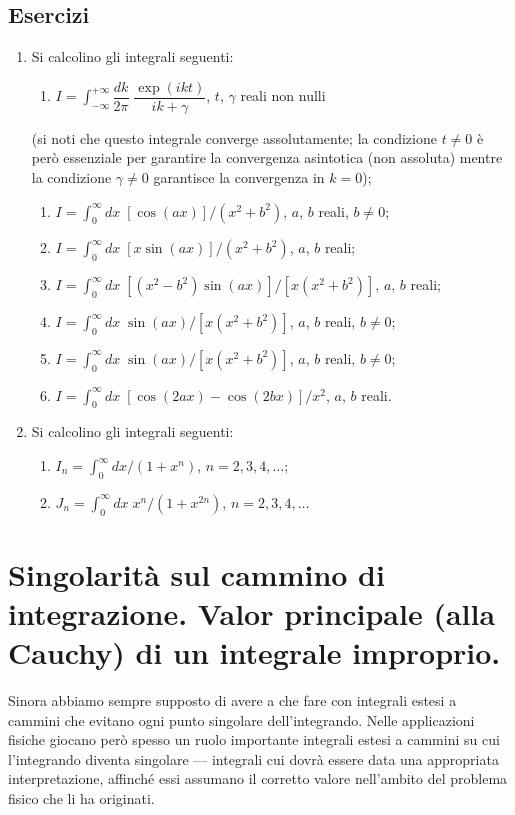 \documentclass[11pt, a4paper]{book}
\numberwithin{equation}{section}
\newenvironment{esercizi}{\subsection*{Esercizi}\begin{enumerate}}{\end{enumerate}}
\begin{document}
\begin{esercizi}
\item Si calcolino gli integrali seguenti:
\begin{enumerate}
\item[i)] $I = \int_{-\infty}^{+\infty} \dfrac{dk}{2\pi}\; \dfrac{\exp(ikt)}{ik+\gamma}$, \quad $t$, $\gamma$ reali non nulli
\end{enumerate}
(si noti che questo integrale converge assolutamente; la condizione $t \neq 0$ è però essenziale per garantire la convergenza asintotica (non assoluta) mentre la condizione $\gamma \neq 0$ garantisce la convergenza in $k=0$);
\begin{enumerate}
\item[ii)] $I = \int_0^{\infty} dx\; \left[\cos(ax)\right] \big/ (x^2+b^2)$, \quad $a$, $b$ reali, $b \neq 0$;
\item[iii)] $I = \int_0^{\infty} dx\; \left[x\sin(ax)\right] \big/ (x^2+b^2)$, \quad $a$, $b$ reali;
\item[iv)] $I = \int_0^{\infty} dx\; \left[(x^2-b^2)\sin(ax)\right] \big/ \left[x(x^2+b^2)\right]$, \quad $a$, $b$ reali;
\item[v)] $I = \int_0^{\infty} dx\; \sin(ax) \big/ \left[x(x^2+b^2)\right]$, \quad $a$, $b$ reali, $b \neq 0$;
\item[vi)] $I = \int_0^{\infty} dx\; \sin(ax) \big/ \left[x(x^2+b^2)\right]$, \quad $a$, $b$ reali, $b \neq 0$; %
\item[vii)] $I = \int_0^{\infty} dx\; \left[\cos(2ax) - \cos(2bx)\right] \big/ x^2$, \quad $a$, $b$ reali.
\end{enumerate}

\item Si calcolino gli integrali seguenti:
\begin{enumerate}
\item[i)] $I_n = \int_0^{\infty} dx \big/ (1+x^n)$, \quad $n = 2, 3, 4, \ldots$;
\item[ii)] $J_n = \int_0^{\infty} dx\; x^n \big/ (1+x^{2n})$, \quad $n = 2, 3, 4, \ldots$
\end{enumerate}
\end{esercizi}

\section{Singolarità sul cammino di integrazione. Valor principale (alla Cauchy) di un integrale improprio.}

Sinora abbiamo sempre supposto di avere a che fare con integrali estesi a cammini che evitano ogni punto singolare dell'integrando. Nelle applicazioni fisiche giocano però spesso un ruolo importante integrali estesi a cammini su cui l'integrando diventa singolare — integrali cui dovrà essere data una appropriata interpretazione, affinché essi assumano il corretto valore nell'ambito del problema fisico che li ha originati.
\end{document}
